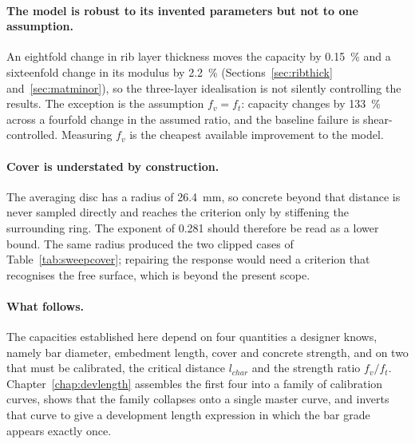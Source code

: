 \paragraph{The model is robust to its invented parameters but not to one
assumption.}
An eightfold change in rib layer thickness moves the capacity by
\SI{0.15}{\percent} and a sixteenfold change in its modulus by
\SI{2.2}{\percent} (Sections~\ref{sec:ribthick} and~\ref{sec:matminor}), so
the three-layer idealisation is not silently controlling the results. The
exception is the assumption $f_v = f_t$: capacity changes by
\SI{133}{\percent} across a fourfold change in the assumed ratio, and the
baseline failure is shear-controlled. Measuring $f_v$ is the cheapest
available improvement to the model.
 
\paragraph{Cover is understated by construction.}
The averaging disc has a radius of \SI{26.4}{\milli\metre}, so concrete
beyond that distance is never sampled directly and reaches the criterion
only by stiffening the surrounding ring. The exponent of \num{0.281} should
therefore be read as a lower bound. The same radius produced the two
clipped cases of Table~\ref{tab:sweepcover}; repairing the response would
need a criterion that recognises the free surface, which is beyond the
present scope.
 
\paragraph{What follows.}
The capacities established here depend on four quantities a designer knows,
namely bar diameter, embedment length, cover and concrete strength, and on
two that must be calibrated, the critical distance $l_{char}$ and the
strength ratio $f_v/f_t$. Chapter~\ref{chap:devlength} assembles the first
four into a family of calibration curves, shows that the family collapses
onto a single master curve, and inverts that curve to give a development
length expression in which the bar grade appears exactly once.